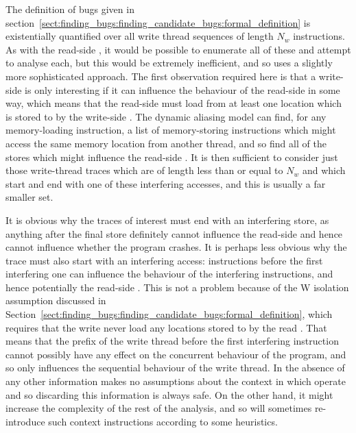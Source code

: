 The definition of bugs given in
section~\ref{sect:finding_bugs:finding_candidate_bugs:formal_definition}
is existentially quantified over all write thread sequences of length
$N_w$ instructions.  As with the read-side
{\StateMachines}, it would be possible to enumerate all of these and
attempt to analyse each, but this would be extremely inefficient, and
so {\technique} uses a slightly more sophisticated approach.  The
first observation required here is that a write-side {\StateMachine}
is only interesting if it can influence the behaviour of the read-side {\StateMachine} in some way, which means that the
read-side {\StateMachine} must load from at least one location which
is stored to by the write-side {\StateMachine}.  The dynamic aliasing
model can find, for any memory-loading instruction, a list of
memory-storing instructions which might access the same memory
location from another thread, and so find all
of the stores which might influence the read-side {\StateMachine}.  It
is then sufficient to consider just those write-thread traces which
are of length less than or equal to $N_w$ and which start and end with
one of these interfering accesses, and this is usually a far smaller set.

It is obvious why the traces of interest must end with an interfering
store, as anything after the final store definitely cannot influence
the read-side {\StateMachine} and hence cannot influence whether the
program crashes.  It is perhaps less obvious why the trace must also
start with an interfering access: instructions before the first
interfering one can influence the behaviour of the interfering
instructions, and hence potentially the read-side {\StateMachine}.
This is not a problem because of the W isolation assumption discussed
in
Section~\ref{sect:finding_bugs:finding_candidate_bugs:formal_definition},
which requires that the write {\StateMachine} never load any locations
stored to by the read {\StateMachine}.  That means that the prefix of
the write thread before the first interfering instruction cannot
possibly have any effect on the concurrent behaviour of the program,
and so only influences the sequential behaviour of the write thread.
In the absence of any other information {\technique} makes no
assumptions about the context in which {\StateMachines} operate and so
discarding this information is always safe.  On the other hand, it
might increase the complexity of the rest of the analysis, and so
{\implementation} will sometimes re-introduce such context
instructions according to some heuristics.  

